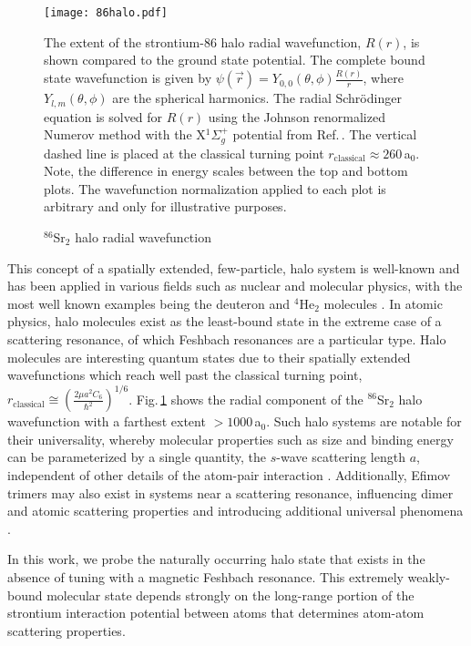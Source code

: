 	\begin{figure}
		\centerline{
		\texttt{[image: 86halo.pdf]}}
		\caption{$^{86}$Sr$_2$ halo radial wavefunction}{The extent of the strontium-86 halo radial wavefunction, $R(r)$, is shown compared to the ground state potential. The complete bound state wavefunction is given by $\psi(\vec{r})=Y_{0,0}(\theta,\phi)\frac{R(r)}{r}$, where $Y_{l,m}(\theta,\phi)$ are the spherical harmonics. The radial Schr\"{o}dinger equation is solved for $R(r)$ using the Johnson renormalized Numerov method \cite{Gibson2016, Johnson1978} with the X$^1\Sigma_g^+$ potential from Ref.\,\cite{Stein2010}. The vertical dashed line is placed at the classical turning point $r_\text{classical} \approx 260$\,a$_0$. Note, the difference in energy scales between the top and bottom plots. The wavefunction normalization applied to each plot is arbitrary and only for illustrative purposes.}
		\label{fig:86halo}
	\end{figure} 
This concept of a spatially extended, few-particle, halo system is well-known and has been applied in various fields such as nuclear and molecular physics, with the most well known examples being the deuteron and $^4$He$_2$ molecules \cite{lmk93,sto94,Kohler2006}.
In atomic physics, halo molecules exist as the least-bound state in the extreme case of a scattering resonance, of which Feshbach resonances are a particular type.
Halo molecules are interesting quantum states due to their spatially extended wavefunctions which reach well past the classical turning point, $r_\text{classical} \cong \left( \frac{2 \mu a^2 C_6}{\hbar^2} \right)^{1/6}$.
Fig.\,\ref{fig:86halo} shows the radial component of the $^{86}$Sr$_2$ halo wavefunction with a farthest extent $>\!1000$\,a$_0$.
Such halo systems are notable for their universality, whereby molecular properties such as size and binding energy can be parameterized by a single quantity, the $s$-wave scattering length $a$, independent of other details of the atom-pair interaction \cite{Kohler2006,bha06}. 
Additionally, Efimov trimers may also exist in systems near a scattering resonance, influencing dimer and atomic scattering properties and introducing additional universal phenomena \cite{bha07,nen17}.

In this work, we probe the naturally occurring halo state that exists in the absence of tuning with a magnetic Feshbach resonance. 
This extremely weakly-bound molecular state depends strongly on the long-range portion of the strontium interaction potential between atoms that determines atom-atom scattering properties.

